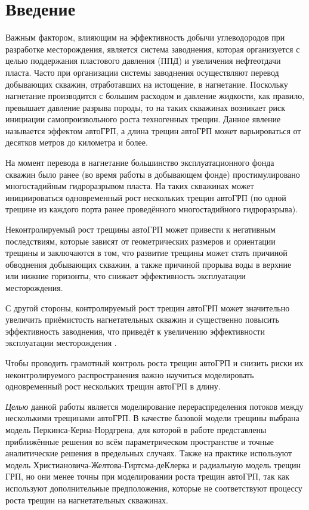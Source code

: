 \chapter*{Введение} %


Важным фактором, влияющим на эффективность добычи углеводородов при разработке месторождения, является система заводнения, которая организуется с целью поддержания пластового давления (ППД) и увеличения нефтеотдачи пласта.
Часто при организации системы заводнения осуществляют перевод добывающих скважин, отработавших на истощение, в нагнетание.
Поскольку нагнетание производится с большим расходом и давление жидкости, как правило, превышает давление разрыва породы, то на таких скважинах возникает риск инициации самопроизвольного роста техногенных трещин.
Данное явление называется эффектом автоГРП, а длина трещин автоГРП может варьироваться от десятков метров до километра и более.

На момент перевода в нагнетание большинство эксплуатационного фонда скважин было ранее (во время работы в добывающем фонде) простимулировано многостадийным гидроразрывом пласта.
На таких скважинах может инициироваться одновременный рост нескольких трещин автоГРП (по одной трещине из каждого порта ранее проведённого многостадийного гидроразрыва).

Неконтролируемый рост трещины автоГРП может привести к негативным последствиям, которые зависят от геометрических размеров и ориентации трещины и заключаются в том, что развитие трещины может стать причиной обводнения добывающих скважин, а также причиной прорыва воды в верхние или нижние горизонты, что снижает эффективность эксплуатации месторождения.

С другой стороны, контролируемый рост трещин автоГРП может значительно увеличить приёмистость нагнетательных скважин и существенно повысить эффективность заводнения, что приведёт к увеличению эффективности эксплуатации месторождения \cite{bazyrov_shel, yakupov}.

Чтобы проводить грамотный контроль роста трещин автоГРП и снизить риски их неконтролируемого распространения важно научиться моделировать одновременный рост нескольких трещин автоГРП в длину.


\emph{Целью} данной работы является моделирование перераспределения потоков между несколькими трещинами автоГРП.
В качестве базовой модели трещины выбрана модель Перкинса-Керна-Нордгрена, для которой в работе \cite{dontsov2021analysis} представлены приближённые решения во всём параметрическом пространстве и точные аналитические решения в предельных случаях.
Также на практике используют модель Христиановича-Желтова-Гиртсма-деКлерка \cite{dontsov1_book} и радиальную модель \cite{dontsov2_book} трещин ГРП, но они менее точны при моделировании роста трещин автоГРП, так как используют дополнительные предположения, которые не соответствуют процессу роста трещин на нагнетательных скважинах.

